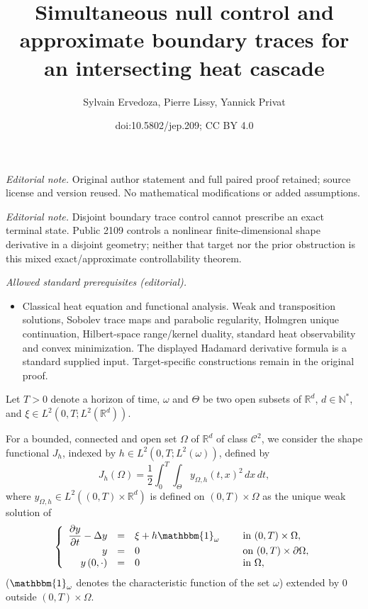 \documentclass[10pt,a4paper]{amsart}
\title{Simultaneous null control and approximate boundary traces for an intersecting heat cascade}
\author{Sylvain Ervedoza, Pierre Lissy, Yannick Privat}
\date{doi:10.5802/jep.209; CC BY 4.0}
\newcommand\R{{\mathbb R}}
\theoremstyle{definition}
\begin{document}
\maketitle
\noindent\textit{Editorial note.} Original author statement and full paired proof retained; source license and version reused. No mathematical modifications or added assumptions.\par\medskip
\noindent\textit{Editorial note.} Disjoint boundary trace control cannot prescribe an exact terminal state. Public 2109 controls a nonlinear finite-dimensional shape derivative in a disjoint geometry; neither that target nor the prior obstruction is this mixed exact/approximate controllability theorem.\par\medskip
\noindent\textit{Allowed standard prerequisites (editorial).}\begin{itemize}
\item Classical heat equation and functional analysis. Weak and transposition solutions, Sobolev trace maps and parabolic regularity, Holmgren unique continuation, Hilbert-space range/kernel duality, standard heat observability and convex minimization. The displayed Hadamard derivative formula is a standard supplied input. Target-specific constructions remain in the original proof.
\end{itemize}\medskip
Let $T>0$ denote a horizon of time, $\omega$ and $\Theta$ be two open subsets of $\R^d$, $d\in\mathbb N^*$, and $\xi \in L^2(0,T; L^2(\R^d))$.

For a bounded, connected and open set $\Omega$ of $\mathbb{R}^d$ of class $\mathscr{C}^2$, we consider the shape functional $J_h$, indexed by $h \in L^2(0,T; L^2(\omega))$, defined by
\begin{equation}
\label{def-J}
J_h(\Omega) = \dfrac{1}{2}\int_{0}^{T} \int_{\Theta}y_{\Omega,h}(t,x)^{2}\, dx\,dt,
\end{equation}
where $y_{\Omega,h}\in L^2((0,T)\times \mathbb R^d)$ is defined on $(0,T)\times\Omega$ as the unique weak solution of
\begin{equation}
\label{y-Omega-h}
\left\{
\begin{array}{rcll}
\dfrac{\partial y}{\partial t}-\Delta y &=&\xi +h\mathbbm{1}_{\omega}\quad&\text{ in }(0,T) \times \Omega,
\\
y&=& 0 &\text{ on }(0,T) \times \partial \Omega,
\\
y\left(0,\cdot\right) &=& 0 &\text{ in }\Omega,
\end{array}
\right.
\end{equation}
($\mathbbm{1}_\omega$ denotes the characteristic function of the set $\omega$) extended by $0$ outside $(0,T) \times \Omega$.
\end{document}
